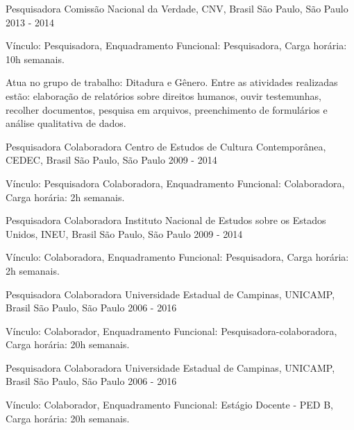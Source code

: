 
\begin{cventries}

\cventry
{Pesquisadora}
{Comissão Nacional da Verdade, CNV, Brasil}
{São Paulo, São Paulo}
{2013 - 2014}
{
\begin{cvitems}
  \item Vínculo: Pesquisadora, Enquadramento Funcional: Pesquisadora, Carga horária: 10h semanais.
  \item Atua no grupo de trabalho: Ditadura e Gênero. Entre as atividades realizadas estão: elaboração de relatórios sobre direitos humanos, ouvir testemunhas, recolher documentos, pesquisa em arquivos, preenchimento de formulários e análise qualitativa de dados.
\end{cvitems}
}

\cventry
{Pesquisadora Colaboradora}
{Centro de Estudos de Cultura Contemporânea, CEDEC, Brasil}
{São Paulo, São Paulo}
{2009 - 2014}
{
\begin{cvitems}
  \item Vínculo: Pesquisadora Colaboradora, Enquadramento Funcional: Colaboradora, Carga horária: 2h semanais.
\end{cvitems}
}

\cventry
{Pesquisadora Colaboradora}
{Instituto Nacional de Estudos sobre os Estados Unidos, INEU, Brasil}
{São Paulo, São Paulo}
{2009 - 2014}
{
\begin{cvitems}
  \item Vínculo: Colaboradora, Enquadramento Funcional: Pesquisadora, Carga horária: 2h semanais.
\end{cvitems}
}

\cventry
{Pesquisadora Colaboradora}
{Universidade Estadual de Campinas, UNICAMP, Brasil}
{São Paulo, São Paulo}
{2006 - 2016}
{
\begin{cvitems}
  \item Vínculo: Colaborador, Enquadramento Funcional: Pesquisadora-colaboradora, Carga horária: 20h semanais.
\end{cvitems}
}

\cventry
{Pesquisadora Colaboradora}
{Universidade Estadual de Campinas, UNICAMP, Brasil}
{São Paulo, São Paulo}
{2006 - 2016}
{
\begin{cvitems}
  \item Vínculo: Colaborador, Enquadramento Funcional: Estágio Docente - PED B, Carga horária: 20h semanais.
\end{cvitems}
}


\end{cventries}
